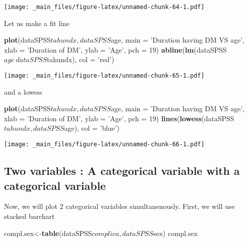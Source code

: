 \documentclass[]{book}
\newenvironment{Shaded}{\begin{snugshade}}{\end{snugshade}}
\newcommand{\KeywordTok}[1]{\textcolor[rgb]{0.13,0.29,0.53}{\textbf{{#1}}}}
\newcommand{\DataTypeTok}[1]{\textcolor[rgb]{0.13,0.29,0.53}{{#1}}}
\newcommand{\DecValTok}[1]{\textcolor[rgb]{0.00,0.00,0.81}{{#1}}}
\newcommand{\StringTok}[1]{\textcolor[rgb]{0.31,0.60,0.02}{{#1}}}
\newcommand{\NormalTok}[1]{{#1}}
\theoremstyle{definition}
\theoremstyle{definition}
\theoremstyle{remark}
\begin{document}
\texttt{[image: \_main\_files/figure-latex/unnamed-chunk-64-1.pdf]}

Let us make a fit line

\begin{Shaded}
\begin{Highlighting}[]
\KeywordTok{plot}\NormalTok{(dataSPSS$tahundx, dataSPSS$age,}
     \DataTypeTok{main =} \StringTok{'Duration having DM VS age'}\NormalTok{,}
     \DataTypeTok{xlab =} \StringTok{'Duration of DM'}\NormalTok{, }\DataTypeTok{ylab =} \StringTok{'Age'}\NormalTok{,}
     \DataTypeTok{pch =} \DecValTok{19}\NormalTok{)}
\KeywordTok{abline}\NormalTok{(}\KeywordTok{lm}\NormalTok{(dataSPSS$age~dataSPSS$tahundx), }\DataTypeTok{col =} \StringTok{'red'}\NormalTok{)}
\end{Highlighting}
\end{Shaded}

\texttt{[image: \_main\_files/figure-latex/unnamed-chunk-65-1.pdf]}

and a lowess

\begin{Shaded}
\begin{Highlighting}[]
\KeywordTok{plot}\NormalTok{(dataSPSS$tahundx, dataSPSS$age,}
     \DataTypeTok{main =} \StringTok{'Duration having DM VS age'}\NormalTok{,}
     \DataTypeTok{xlab =} \StringTok{'Duration of DM'}\NormalTok{, }\DataTypeTok{ylab =} \StringTok{'Age'}\NormalTok{,}
     \DataTypeTok{pch =} \DecValTok{19}\NormalTok{)}
\KeywordTok{lines}\NormalTok{(}\KeywordTok{lowess}\NormalTok{(dataSPSS$tahundx,dataSPSS$age), }\DataTypeTok{col =} \StringTok{'blue'}\NormalTok{)}
\end{Highlighting}
\end{Shaded}

\texttt{[image: \_main\_files/figure-latex/unnamed-chunk-66-1.pdf]}

\subsection{Two variables : A categorical variable with a categorical
variable}\label{two-variables-a-categorical-variable-with-a-categorical-variable}

Now, we will plot 2 categorical variables simultanenously. First, we
will use stacked barchart

\begin{Shaded}
\begin{Highlighting}[]
\NormalTok{compl.sex<-}\KeywordTok{table}\NormalTok{(dataSPSS$complica,dataSPSS$sex)}
\NormalTok{compl.sex}
\end{Highlighting}
\end{Shaded}
\end{document}
